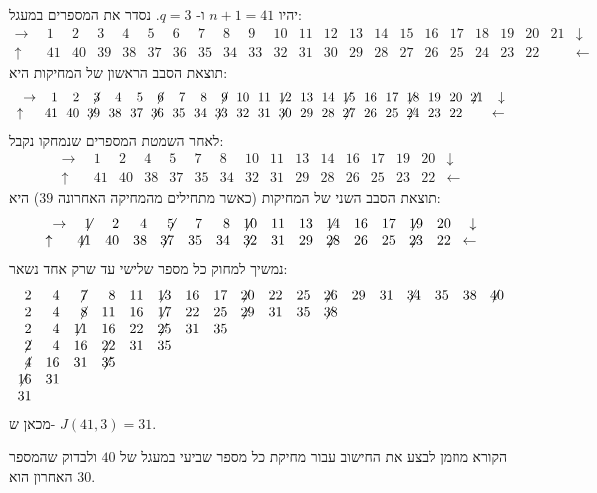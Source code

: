 \begin{example}
יהיו
$n+1=41$
ו-%
$q=3$.
נסדר את המספרים במעגל:
\[
\begin{array}{rrrrrrrrrrrrrrrrrrrrrrr}
\rightarrow\!&\!1\!&\!2\!&\!3\!&\!4\!&\!5\!&\!6\!&\!7\!&\!8\!&\!9\!&\!10\!&\!
           11\!&\!12\!&\!13\!&\!14\!&\!15\!&\!16\!&\!17\!&\!18\!&\!19\!&\!20\!&\!21\!&\!
\downarrow\\
\uparrow\quad\!&\!41\!&\!40\!&\!39\!&\!38\!&\!37\!&\!36\!&\!35\!&\!34\!&\!33\!&\!
32\!&\!31\!&\!30\!&\!29\!&\!28\!&\!27\!&\!26\!&\!25\!&\!24\!&\!23\!&\!22\!&\!
&\leftarrow
\end{array}
\]
תוצאת הסבב הראשון של המחיקות היא:
\[
\begin{array}{rrrrrrrrrrrrrrrrrrrrrrr}
\rightarrow\!&\!1\!&\!2\!&\!\not\! 3\!&\!4\!&\!5\!&\!\not\! 6\!&\!7\!&\!8\!&\!\not\! 9\!&\!10\!&\!
           11\!&\!\not\!\! 12\!&\!13\!&\!14\!&\!\not\!\! 15\!&\!16\!&\!17\!&\!\not\!\! 18\!&\!19\!&\!20\!&\!\not\!\! 21\!&\!
\downarrow\\
	\uparrow\quad\!&\!41\!&\!40\!&\!\not\!\! 39\!&\!38\!&\!37\!&\!\not\!\! 36\!&\!35\!&\!34\!&\!\not\!\! 33\!&\!
32\!&\!31\!&\!\not\!\! 30\!&\!29\!&\!28\!&\!\not\!\! 27\!&\!26\!&\!25\!&\!\not\!\! 24\!&\!23\!&\!22\!&\!
\!&\!\leftarrow
\end{array}
\]
לאחר השמטת המספרים שנמחקו נקבל:
\[
\begin{array}{rrrrrrrrrrrrrrrrrrrrrrrrrrrr}
\rightarrow\!&1&2&4&5&7&8&10&11&13&14&16&17&19&20&\!\downarrow\\
\uparrow\quad\!&41&40&38&37&35&34&32&31&29&28&26&25&23&22&\!\leftarrow
\end{array}
\]
תוצאת הסבב השני של המחיקות (כאשר מתחילים מהמחיקה האחרונה
$39$)
היא:
\[
\begin{array}{rrrrrrrrrrrrrrrrrrrrrrrrrrrr}
\rightarrow\!&\not\!\!1&2&4&\not\!\!5&7&8&\not\!\!10&11&13&\not\!\!14&16&17&\not\!\!19&20&\!\downarrow\\
\uparrow\quad\!&\not\!\!41&40&38&\not\!\!37&35&34&\not\!\!32&31&29&\not\!\!28&26&25&\not\!\!23&22&\!\leftarrow
\end{array}
\]
נמשיך למחוק כל מספר שלישי עד שרק אחד נשאר:
\[
\begin{array}{rrrrrrrrrrrrrrrrrr}
2&4&\not\!7&8&11&\not\!\!13&16&17&\not\!\!20&22&25&\not\!\!26&29&31&\not\!\!34&35&38&\not\!\!40
\\
2&4&\not\!8&11&16&\not\!\!17&22&25&\not\!\!29&31&35&\not\!\!38
\\
2&4&\not\!\!11&16&22&\not\!\!25&31&35
\\
\not\!2&4&16&\not\!\!22&31&35
\\
\not\!4&16&31&\not\!\!35
\\
\not\!\!16&31
\\
31
\end{array}
\]
מכאן ש-%
$J(41,3)=31$.
\end{example}
הקורא מוזמן לבצע את החישוב עבור מחיקת כל מספר שביעי במעגל של 
$40$
ולבדוק שהמספר האחרון הוא
$30$.

